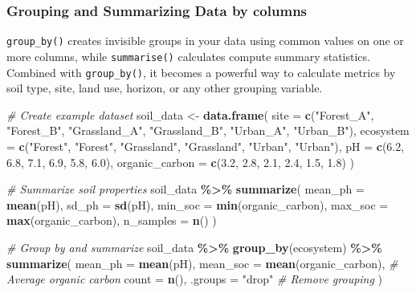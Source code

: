 \documentclass[
  10pt,
  b5paper,
  oneside]{book}
\newenvironment{Shaded}{\begin{snugshade}}{\end{snugshade}}
\newcommand{\AttributeTok}[1]{\textcolor[rgb]{0.13,0.29,0.53}{#1}}
\newcommand{\CommentTok}[1]{\textcolor[rgb]{0.56,0.35,0.01}{\textit{#1}}}
\newcommand{\FloatTok}[1]{\textcolor[rgb]{0.00,0.00,0.81}{#1}}
\newcommand{\FunctionTok}[1]{\textcolor[rgb]{0.13,0.29,0.53}{\textbf{#1}}}
\newcommand{\NormalTok}[1]{#1}
\newcommand{\OtherTok}[1]{\textcolor[rgb]{0.56,0.35,0.01}{#1}}
\newcommand{\SpecialCharTok}[1]{\textcolor[rgb]{0.81,0.36,0.00}{\textbf{#1}}}
\newcommand{\StringTok}[1]{\textcolor[rgb]{0.31,0.60,0.02}{#1}}
\begin{document}
\subsubsection{Grouping and Summarizing Data by columns}\label{dplyr-group}

\texttt{group\_by()} creates invisible groups in your data using common values on one or more columns, while \texttt{summarise()} calculates compute summary statistics.
Combined with \texttt{group\_by()}, it becomes a powerful way to calculate metrics by soil type, site, land use, horizon, or any other grouping variable.

\begin{Shaded}
\begin{Highlighting}[]
\CommentTok{\# Create example dataset}
\NormalTok{soil\_data }\OtherTok{\textless{}{-}} \FunctionTok{data.frame}\NormalTok{(}
\AttributeTok{site =} \FunctionTok{c}\NormalTok{(}\StringTok{"Forest\_A"}\NormalTok{, }\StringTok{"Forest\_B"}\NormalTok{, }\StringTok{"Grassland\_A"}\NormalTok{, }\StringTok{"Grassland\_B"}\NormalTok{, }\StringTok{"Urban\_A"}\NormalTok{, }\StringTok{"Urban\_B"}\NormalTok{),}
\AttributeTok{ecosystem =} \FunctionTok{c}\NormalTok{(}\StringTok{"Forest"}\NormalTok{, }\StringTok{"Forest"}\NormalTok{, }\StringTok{"Grassland"}\NormalTok{, }\StringTok{"Grassland"}\NormalTok{, }\StringTok{"Urban"}\NormalTok{, }\StringTok{"Urban"}\NormalTok{),}
\AttributeTok{pH =} \FunctionTok{c}\NormalTok{(}\FloatTok{6.2}\NormalTok{, }\FloatTok{6.8}\NormalTok{, }\FloatTok{7.1}\NormalTok{, }\FloatTok{6.9}\NormalTok{, }\FloatTok{5.8}\NormalTok{, }\FloatTok{6.0}\NormalTok{),}
\AttributeTok{organic\_carbon =} \FunctionTok{c}\NormalTok{(}\FloatTok{3.2}\NormalTok{, }\FloatTok{2.8}\NormalTok{, }\FloatTok{2.1}\NormalTok{, }\FloatTok{2.4}\NormalTok{, }\FloatTok{1.5}\NormalTok{, }\FloatTok{1.8}\NormalTok{)}
\NormalTok{)}

\CommentTok{\# Summarize soil properties}
\NormalTok{soil\_data }\SpecialCharTok{\%\textgreater{}\%}
  \FunctionTok{summarize}\NormalTok{(}
    \AttributeTok{mean\_ph =} \FunctionTok{mean}\NormalTok{(pH),}
    \AttributeTok{sd\_ph =} \FunctionTok{sd}\NormalTok{(pH),}
    \AttributeTok{min\_soc =} \FunctionTok{min}\NormalTok{(organic\_carbon),}
    \AttributeTok{max\_soc =} \FunctionTok{max}\NormalTok{(organic\_carbon),}
    \AttributeTok{n\_samples =} \FunctionTok{n}\NormalTok{()}
\NormalTok{  )}

\CommentTok{\# Group by and summarize}
\NormalTok{soil\_data }\SpecialCharTok{\%\textgreater{}\%}
  \FunctionTok{group\_by}\NormalTok{(ecosystem) }\SpecialCharTok{\%\textgreater{}\%}
  \FunctionTok{summarize}\NormalTok{(}
    \AttributeTok{mean\_ph =} \FunctionTok{mean}\NormalTok{(pH),}
    \AttributeTok{mean\_soc =} \FunctionTok{mean}\NormalTok{(organic\_carbon), }\CommentTok{\# Average organic carbon}
    \AttributeTok{count =} \FunctionTok{n}\NormalTok{(),  }
  \AttributeTok{.groups =} \StringTok{"drop"}                   \CommentTok{\# Remove grouping}
\NormalTok{)}
\end{Highlighting}
\end{Shaded}
\end{document}
